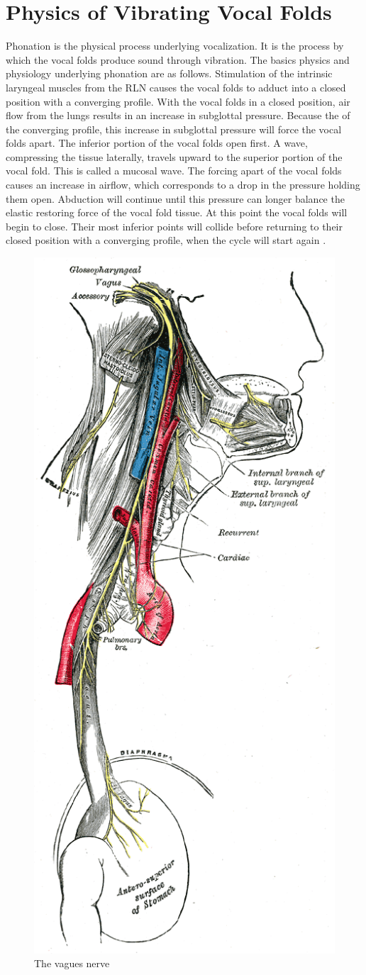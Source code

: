 \documentclass[12pt, letter]{report}
\begin{document}
\section{Physics of Vibrating Vocal Folds}
Phonation is the physical process underlying vocalization. It is the process by which the vocal folds produce sound through vibration. The basics physics and physiology underlying phonation are as follows. Stimulation of the intrinsic laryngeal muscles from the RLN causes the vocal folds to adduct into a closed position with a converging profile. With the vocal folds in a closed position, air flow from the lungs results in an increase in subglottal pressure. Because the of the converging profile, this increase in subglottal pressure will force the vocal folds apart. The inferior portion of the vocal folds open first. A wave, compressing the tissue laterally, travels upward to the superior portion of the vocal fold. This is called a mucosal wave. The forcing apart of the vocal folds causes an increase in airflow, which corresponds to a drop in the pressure holding them open. Abduction will continue until this pressure can longer balance the elastic restoring force of the vocal fold tissue. At this point the vocal folds will begin to close. Their most inferior points will collide before returning to their closed position with a converging profile, when the cycle will start again \cite{Titze2000, Berke2010}.
\begin{figure}
\centering
\includegraphics[width=0.5\linewidth]{vagus_nerve.png}
\caption{The vagues nerve \cite{Gray2000Anatomy}}
\label{fig:vagus_nerve}
\end{figure}
\end{document}
